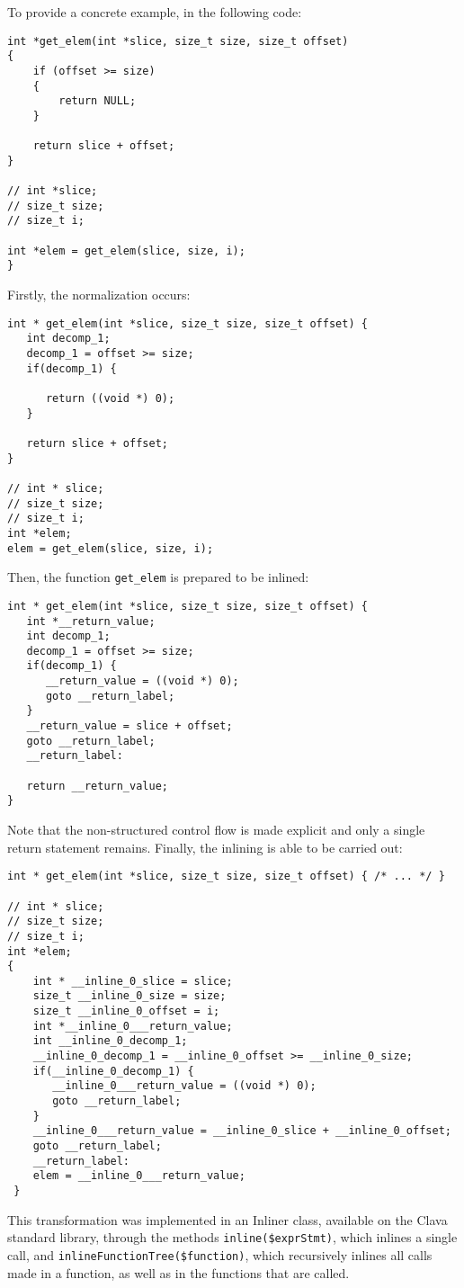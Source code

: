 To provide a concrete example, in the following code:

\begin{lstlisting}
int *get_elem(int *slice, size_t size, size_t offset)
{
    if (offset >= size)
    {
        return NULL;
    }

    return slice + offset;
}

// int *slice;
// size_t size;
// size_t i;

int *elem = get_elem(slice, size, i);
}
\end{lstlisting}

Firstly, the normalization occurs:

\begin{lstlisting}
int * get_elem(int *slice, size_t size, size_t offset) {
   int decomp_1;
   decomp_1 = offset >= size;
   if(decomp_1) {
      
      return ((void *) 0);
   }
   
   return slice + offset;
}

// int * slice;
// size_t size;
// size_t i;
int *elem;
elem = get_elem(slice, size, i);
\end{lstlisting}

Then, the function \verb|get_elem| is prepared to be inlined:

\begin{lstlisting}
int * get_elem(int *slice, size_t size, size_t offset) {
   int *__return_value;
   int decomp_1;
   decomp_1 = offset >= size;
   if(decomp_1) {
      __return_value = ((void *) 0);
      goto __return_label;
   }
   __return_value = slice + offset;
   goto __return_label;
   __return_label:
   
   return __return_value;
}
\end{lstlisting}

Note that the non-structured control flow is made explicit and only a single return statement remains. Finally, the inlining is able to be carried out:

\begin{lstlisting}
int * get_elem(int *slice, size_t size, size_t offset) { /* ... */ }

// int * slice;
// size_t size;
// size_t i;
int *elem;
{
    int * __inline_0_slice = slice;
    size_t __inline_0_size = size;
    size_t __inline_0_offset = i;
    int *__inline_0___return_value;
    int __inline_0_decomp_1;
    __inline_0_decomp_1 = __inline_0_offset >= __inline_0_size;
    if(__inline_0_decomp_1) {
       __inline_0___return_value = ((void *) 0);
       goto __return_label;
    }
    __inline_0___return_value = __inline_0_slice + __inline_0_offset;
    goto __return_label;
    __return_label:
    elem = __inline_0___return_value;
 }
\end{lstlisting}

This transformation was implemented in an Inliner class, available on the Clava standard library, through the methods \verb|inline($exprStmt)|, which inlines a single call, and \linebreak \verb|inlineFunctionTree($function)|, which recursively inlines all calls made in a function, as well as in the functions that are called.
